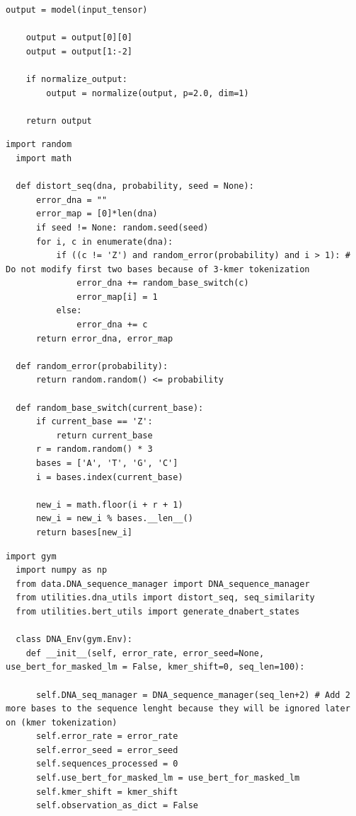 \documentclass[oneside,bibliography=totocnumbered,BCOR=5mm]{scrbook}%
\theoremstyle{definition}
\theoremstyle{definition}
\theoremstyle{definition}
\theoremstyle{definition}
\theoremstyle{definition}
\theoremstyle{definition}
\begin{document}
\begin{appendix}
\begin{lstlisting}[caption={Generierung der DNABERT-States anhand der Input-DNA-Sequenz}]
    output = model(input_tensor)

    output = output[0][0] 
    output = output[1:-2]

    if normalize_output:
        output = normalize(output, p=2.0, dim=1)

    return output
\end{lstlisting}

\begin{lstlisting}[caption={Erzeugung zufälliger Fehler in der Input-DNA-Sequenz}]
  import random 
  import math 

  def distort_seq(dna, probability, seed = None):
      error_dna = ""
      error_map = [0]*len(dna)
      if seed != None: random.seed(seed)
      for i, c in enumerate(dna):
          if ((c != 'Z') and random_error(probability) and i > 1): # Do not modify first two bases because of 3-kmer tokenization
              error_dna += random_base_switch(c)
              error_map[i] = 1
          else:
              error_dna += c
      return error_dna, error_map

  def random_error(probability):
      return random.random() <= probability

  def random_base_switch(current_base):
      if current_base == 'Z':
          return current_base
      r = random.random() * 3
      bases = ['A', 'T', 'G', 'C']
      i = bases.index(current_base)

      new_i = math.floor(i + r + 1)
      new_i = new_i % bases.__len__()
      return bases[new_i]
\end{lstlisting}

\begin{lstlisting}[caption={DNA-Environment Basisklasse}]
  import gym
  import numpy as np
  from data.DNA_sequence_manager import DNA_sequence_manager
  from utilities.dna_utils import distort_seq, seq_similarity
  from utilities.bert_utils import generate_dnabert_states

  class DNA_Env(gym.Env):
    def __init__(self, error_rate, error_seed=None, use_bert_for_masked_lm = False, kmer_shift=0, seq_len=100):

      self.DNA_seq_manager = DNA_sequence_manager(seq_len+2) # Add 2 more bases to the sequence lenght because they will be ignored later on (kmer tokenization)
      self.error_rate = error_rate
      self.error_seed = error_seed
      self.sequences_processed = 0
      self.use_bert_for_masked_lm = use_bert_for_masked_lm
      self.kmer_shift = kmer_shift
      self.observation_as_dict = False


\end{lstlisting}
\end{appendix}
\end{document}
